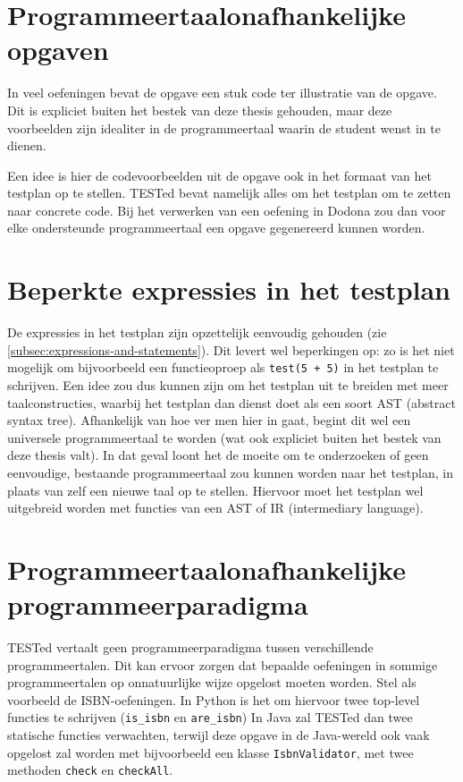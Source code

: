\section{Programmeertaalonafhankelijke opgaven}\label{sec:programmeertaalonafhankelijke-opgaven}

In veel oefeningen bevat de opgave een stuk code ter illustratie van de opgave.
Dit is expliciet buiten het bestek van deze thesis gehouden, maar deze voorbeelden zijn idealiter in de programmeertaal waarin de student wenst in te dienen.

Een idee is hier de codevoorbeelden uit de opgave ook in het formaat van het testplan op te stellen.
TESTed bevat namelijk alles om het testplan om te zetten naar concrete code.
Bij het verwerken van een oefening in Dodona zou dan voor elke ondersteunde programmeertaal een opgave gegenereerd kunnen worden.

\section{Beperkte expressies in het testplan}\label{sec:beperkte-expressies-in-het-testplan}

De expressies in het testplan zijn opzettelijk eenvoudig gehouden (zie \cref{subsec:expressions-and-statements}).
Dit levert wel beperkingen op: zo is het niet mogelijk om bijvoorbeeld een functieoproep als \texttt{test(5 + 5)} in het testplan te schrijven.
Een idee zou dus kunnen zijn om het testplan uit te breiden met meer taalconstructies, waarbij het testplan dan dienst doet als een soort AST (abstract syntax tree).
Afhankelijk van hoe ver men hier in gaat, begint dit wel een universele programmeertaal te worden (wat ook expliciet buiten het bestek van deze thesis valt).
In dat geval loont het de moeite om te onderzoeken of geen eenvoudige, bestaande programmeertaal  zou kunnen worden naar het testplan, in plaats van zelf een nieuwe taal op te stellen.
Hiervoor moet het testplan wel uitgebreid worden met functies van een AST of IR (intermediary language).


\section{Programmeertaalonafhankelijke programmeerparadigma}\label{sec:programmeerparadigma}

TESTed vertaalt geen programmeerparadigma tussen verschillende programmeertalen.
Dit kan ervoor zorgen dat bepaalde oefeningen in sommige programmeertalen op onnatuurlijke wijze opgelost moeten worden.
Stel als voorbeeld de ISBN-oefeningen.
In Python is het  om hiervoor twee top-level functies te schrijven (\texttt{is\_isbn} en \texttt{are\_isbn})
In Java zal TESTed dan twee statische functies verwachten, terwijl deze opgave in de Java-wereld ook vaak opgelost zal worden met bijvoorbeeld een klasse \texttt{IsbnValidator}, met twee methoden \texttt{check} en \texttt{checkAll}.

